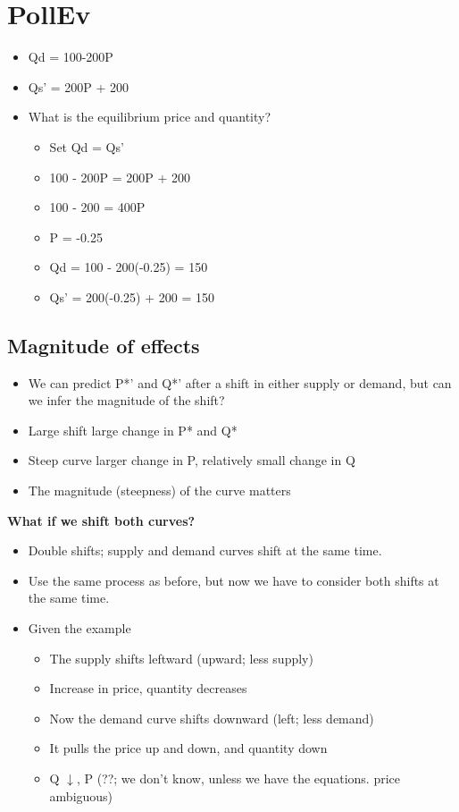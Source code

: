 \documentclass{article}
\begin{document}
\section*{PollEv}
\begin{itemize}
  \item Qd = 100-200P
  \item Qs' = 200P + 200
  \item What is the equilibrium price and quantity?
    \begin{itemize}
      \item Set Qd = Qs'
      \item 100 - 200P = 200P + 200
      \item 100 - 200 = 400P
      \item P = -0.25
      \item Qd = 100 - 200(-0.25) = 150
      \item Qs' = 200(-0.25) + 200 = 150
    \end{itemize}
\end{itemize}

\subsection{Magnitude of effects}
\begin{itemize}
  \item We can predict P*' and Q*' after a shift in either supply or demand,
    but can we infer the magnitude of the shift?
  \item Large shift \rightarrow{} large change in P* and Q*
  \item Steep curve \rightarrow{} larger change in P, relatively small change in Q
  \item The magnitude (steepness) of the curve matters
\end{itemize}

\textbf{What if we shift both curves?}
\begin{itemize}
  \item Double shifts; supply and demand curves shift at the same time.
  \item Use the same process as before, but now we have to consider
    both shifts at the same time.
  \item Given the example
    \begin{itemize}
      \item The supply shifts leftward (upward; less supply)
      \item Increase in price, quantity decreases
      \item Now the demand curve shifts downward (left; less demand)
      \item It pulls the price up and down, and quantity down
      \item Q $\downarrow{}$, P (??; we don't know, unless we have the equations. price ambiguous)
    \end{itemize}
\end{itemize}
\end{document}
